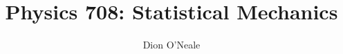 \documentclass{article}
\title{Physics 708: Statistical Mechanics}
\author{Dion O'Neale}
\begin{document}
\maketitle
\tableofcontents

%







%

%

%

%

%







\\
\\
\end{document}
